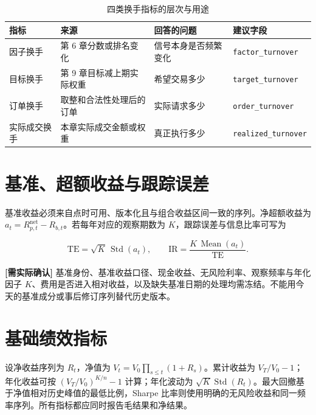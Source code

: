 \begin{table}[htbp]
  \centering
  \small
  \caption{四类换手指标的层次与用途}
  \label{tab:ch10-turnover-levels}
  \begin{tabularx}{\textwidth}{p{3.0cm} p{3.6cm} p{3.2cm} Y}
    \toprule
    指标 & 来源 & 回答的问题 & 建议字段 \\
    \midrule
    因子换手 & 第 6 章分数或排名变化 & 信号本身是否频繁变化 & \texttt{factor\_turnover} \\
    目标换手 & 第 9 章目标减上期实际权重 & 希望交易多少 & \texttt{target\_turnover} \\
    订单换手 & 取整和合法性处理后的订单 & 实际请求多少 & \texttt{order\_turnover} \\
    实际成交换手 & 本章实际成交金额或权重 & 真正执行多少 & \texttt{realized\_turnover} \\
    \bottomrule
  \end{tabularx}
\end{table}

\section{基准、超额收益与跟踪误差}

基准收益必须来自点时可用、版本化且与组合收益区间一致的序列。净超额收益为 \(a_t=R^{\mathrm{net}}_{p,t}-R_{b,t}\)。若每年对应的观察期数为 \(K\)，跟踪误差与信息比率可写为

\begin{equation}
  \mathrm{TE}=\sqrt{K}\,\operatorname{Std}(a_t),
  \qquad
  \mathrm{IR}=\frac{K\,\operatorname{Mean}(a_t)}{\mathrm{TE}}.
  \label{eq:ch10-te-ir}
\end{equation}

\begin{confirmbox}
\textbf{[需实际确认]} 基准身份、基准收益口径、现金收益、无风险利率、观察频率与年化因子 \(K\)、费用是否进入相对收益，以及缺失基准日期的处理均需冻结。不能用今天的基准成分或事后修订序列替代历史版本。
\end{confirmbox}

\section{基础绩效指标}

设净收益序列为 \(R_t\)，净值为 \(V_t=V_0\prod_{s\le t}(1+R_s)\)。累计收益为 \(V_T/V_0-1\)；年化收益可按 \((V_T/V_0)^{K/n}-1\) 计算；年化波动为 \(\sqrt{K}\operatorname{Std}(R_t)\)。最大回撤基于净值相对历史峰值的最低比例，Sharpe 比率则使用明确的无风险收益和同一频率序列。所有指标都应同时报告毛结果和净结果。

